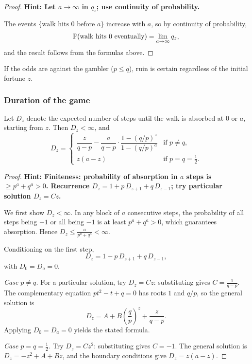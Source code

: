 \documentclass[a4paper]{article}
\begin{document}
\begin{proof}
  \textbf{Hint: Let $a \to \infty$ in $q_z$; use continuity of probability.}

  The events $\{\text{walk hits $0$ before $a$}\}$ increase with $a$, so by continuity of probability,
  \[
    \P(\text{walk hits $0$ eventually}) = \lim_{a \to \infty} q_z,
  \]
  and the result follows from the formulas above.
\end{proof}

\begin{remark}
  If the odds are against the gambler ($p \leq q$), ruin is certain regardless of the initial fortune $z$.
\end{remark}

\subsubsection*{Duration of the game}
\begin{prop}
  Let $D_z$ denote the expected number of steps until the walk is absorbed at $0$ or $a$, starting from $z$.
  Then $D_z < \infty$, and
  \[
    D_z = \begin{cases}
      \dfrac{z}{q - p} - \dfrac{a}{q - p} \cdot \dfrac{1 - (q/p)^z}{1 - (q/p)^a} & \text{if } p \neq q, \\[8pt]
      z(a - z) & \text{if } p = q = \frac{1}{2}.
    \end{cases}
  \]
\end{prop}

\begin{proof}
  \textbf{Hint: Finiteness: probability of absorption in $a$ steps is $\geq p^a + q^a > 0$. Recurrence $D_z = 1 + p\,D_{z+1} + q\,D_{z-1}$; try particular solution $D_z = Cz$.}

  We first show $D_z < \infty$.
  In any block of $a$ consecutive steps, the probability of all steps being $+1$ or all being $-1$ is at least $p^a + q^a > 0$, which guarantees absorption.
  Hence $D_z \leq \frac{a}{p^a + q^a} < \infty$.

  Conditioning on the first step,
  \[
    D_z = 1 + p\,D_{z+1} + q\,D_{z-1},
  \]
  with $D_0 = D_a = 0$.

  \emph{Case $p \neq q$.}
  For a particular solution, try $D_z = Cz$: substituting gives $C = \frac{1}{q - p}$.
  The complementary equation $pt^2 - t + q = 0$ has roots $1$ and $q/p$, so the general solution is
  \[
    D_z = A + B\left(\frac{q}{p}\right)^z + \frac{z}{q - p}.
  \]
  Applying $D_0 = D_a = 0$ yields the stated formula.

  \emph{Case $p = q = \frac{1}{2}$.}
  Try $D_z = Cz^2$: substituting gives $C = -1$.
  The general solution is $D_z = -z^2 + A + Bz$, and the boundary conditions give $D_z = z(a - z)$.
\end{proof}
\end{document}
